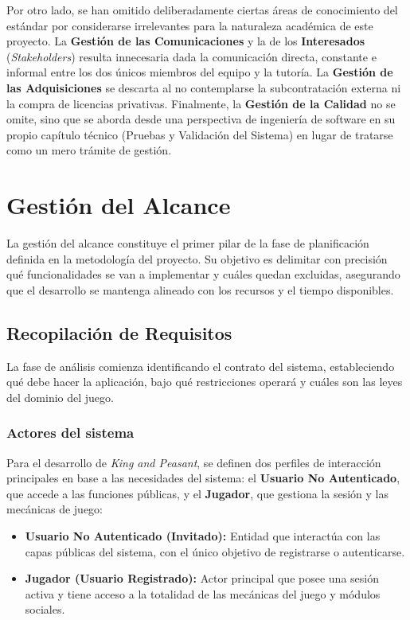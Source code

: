 Por otro lado, se han omitido deliberadamente ciertas áreas de conocimiento del estándar por considerarse irrelevantes para la naturaleza académica de este proyecto. La \textbf{Gestión de las Comunicaciones} y la de los \textbf{Interesados} (\textit{Stakeholders}) resulta innecesaria dada la comunicación directa, constante e informal entre los dos únicos miembros del equipo y la tutoría. La \textbf{Gestión de las Adquisiciones} se descarta al no contemplarse la subcontratación externa ni la compra de licencias privativas. Finalmente, la \textbf{Gestión de la Calidad} no se omite, sino que se aborda desde una perspectiva de ingeniería de software en su propio capítulo técnico (Pruebas y Validación del Sistema) en lugar de tratarse como un mero trámite de gestión.

\section{Gestión del Alcance}

La gestión del alcance constituye el primer pilar de la fase de planificación definida en la metodología del proyecto. Su objetivo es delimitar con precisión qué funcionalidades se van a implementar y cuáles quedan excluidas, asegurando que el desarrollo se mantenga alineado con los recursos y el tiempo disponibles.

\subsection{Recopilación de Requisitos}

La fase de análisis comienza identificando el contrato del sistema, estableciendo qué debe hacer la aplicación, bajo qué restricciones operará y cuáles son las leyes del dominio del juego.

\subsubsection{Actores del sistema}

Para el desarrollo de \textit{King and Peasant}, se definen dos perfiles de interacción principales en base a las necesidades del sistema: el \textbf{Usuario No Autenticado}, que accede a las funciones públicas, y el \textbf{Jugador}, que gestiona la sesión y las mecánicas de juego: 

\begin{itemize}
    \item \textbf{Usuario No Autenticado (Invitado):} Entidad que interactúa con las capas públicas del sistema, con el único objetivo de registrarse o autenticarse.
    \item \textbf{Jugador (Usuario Registrado):} Actor principal que posee una sesión activa y tiene acceso a la totalidad de las mecánicas del juego y módulos sociales.
\end{itemize}

